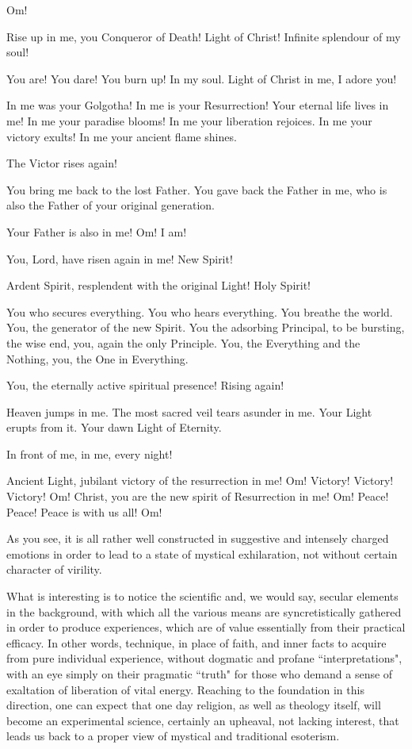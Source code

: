 \begin{quotationx}
Om!

Rise up in me, you Conqueror of Death! Light of Christ! Infinite splendour of my soul!

You are! You dare! You burn up! In my soul. Light of Christ in me, I adore you!

In me was your Golgotha! In me is your Resurrection! Your eternal life lives in me! In me your paradise blooms! In me your liberation rejoices. In me your victory exults! In me your ancient flame shines. 

The Victor rises again!

You bring me back to the lost Father. You gave back the Father in me, who is also the Father of your original generation.

Your Father is also in me! Om! I am!

You, Lord, have risen again in me! New Spirit!

Ardent Spirit, resplendent with the original Light! Holy Spirit!

You who secures everything. You who hears everything. You breathe the world. You, the generator of the new Spirit. You the adsorbing Principal, to be bursting, the wise end, you, again the only Principle. You, the Everything and the Nothing, you, the One in Everything. 

You, the eternally active spiritual presence! Rising again!

Heaven jumps in me. The most sacred veil tears asunder in me. Your Light erupts from it. Your dawn Light of Eternity. 

In front of me, in me, every night!

Ancient Light, jubilant victory of the resurrection in me! Om! Victory! Victory! Victory! Om! Christ, you are the new spirit of Resurrection in me! Om! Peace! Peace! Peace is with us all! Om! 

\end{quotationx}
As you see, it is all rather well constructed in suggestive and intensely charged emotions in order to lead to a state of mystical exhilaration, not without certain character of virility.

What is interesting is to notice the scientific and, we would say, secular elements in the background, with which all the various means are syncretistically gathered in order to produce experiences, which are of value essentially from their practical efficacy. In other words, technique, in place of faith, and inner facts to acquire from pure individual experience, without dogmatic and profane ``interpretations", with an eye simply on their pragmatic ``truth" for those who demand a sense of exaltation of liberation of vital energy. Reaching to the foundation in this direction, one can expect that one day religion, as well as theology itself, will become an experimental science, certainly an upheaval, not lacking interest, that leads us back to a proper view of mystical and traditional esoterism.

